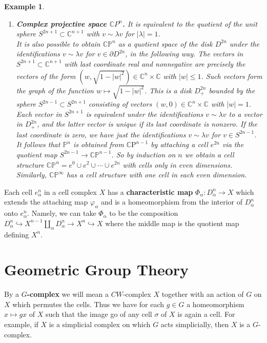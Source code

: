 \documentclass{book}
\newtheorem{example}{Example}
\begin{document}
\begin{example}
\begin{enumerate}
        \item \textbf{Complex projective space $\mathbb{C} P^n$.} It is equivalent to the quotient of the unit sphere $S^{2 n+1} \subset \mathbb{C}^{n+1}$ with $v \sim \lambda v$ for $|\lambda|=1$. \\
        It is also possible to obtain $\mathbb{C P}^n$ as a quotient space of the disk $D^{2 n}$ under the identifications $v \sim \lambda v$ for $v \in \partial D^{2 n}$, in the following way. The vectors in $S^{2 n+1} \subset \mathbb{C}^{n+1}$ with last coordinate real and nonnegative are precisely the vectors of the form $\left(w, \sqrt{1-|w|^2}\right) \in \mathbb{C}^n \times \mathbb{C}$ with $|w| \leq 1$. Such vectors form the graph of the function $w \mapsto \sqrt{1-|w|^2}$. This is a disk $D_{+}^{2 n}$ bounded by the sphere $S^{2 n-1} \subset S^{2 n+1}$ consisting of vectors $(w, 0) \in \mathbb{C}^n \times \mathbb{C}$ with $|w|=1$. Each vector in $S^{2 n+1}$ is equivalent under the identifications $v \sim \lambda v$ to a vector in $D_{+}^{2 n}$, and the latter vector is unique if its last coordinate is nonzero. If the last coordinate is zero, we have just the identifications $v \sim \lambda v$ for $v \in S^{2 n-1}$.\\
        It follows that $\mathbb{P}^n$ is obtained from $\mathbb{C} \mathrm{P}^{n-1}$ by attaching a cell $e^{2 n}$ via the quotient map $S^{2 n-1} \rightarrow \mathbb{C P}^{n-1}$. So by induction on $n$ we obtain a cell structure $\mathbb{C P}^n=e^0 \cup e^2 \cup \cdots \cup e^{2 n}$ with cells only in even dimensions. Similarly, $\mathbb{C P}^{\infty}$ has a cell structure with one cell in each even dimension.
    \end{enumerate}
\end{example}

Each cell $e_\alpha^n$ in a cell complex $X$ has a \textbf{characteristic map} $\Phi_\alpha: D_\alpha^n \rightarrow X$ which extends the attaching map $\varphi_\alpha$ and is a homeomorphism from the interior of $D_\alpha^n$ onto $e_\alpha^n$. Namely, we can take $\Phi_\alpha$ to be the composition $D_\alpha^n \hookrightarrow X^{n-1} \coprod_\alpha D_\alpha^n \rightarrow X^n \hookrightarrow X$ where the middle map is the quotient map defining $X^n$. 


\chapter{Geometric Group Theory}

By a \textbf{$G$-complex} we will mean a $C W$-complex $X$ together with an action of $G$ on $X$ which permutes the cells. Thus we have for each $g \in G$ a homeomorphism $x \mapsto g x$ of $X$ such that the image go of any cell $\sigma$ of $X$ is again a cell. For example, if $X$ is a simplicial complex on which $G$ acts simplicially, then $X$ is a $G$-complex.
\end{document}
